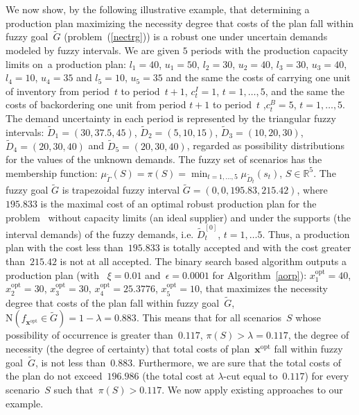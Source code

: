 \documentclass[11pt]{article}
\newcommand{\Rset}{\mathbb{R}}
\begin{document}
We now show, by the following illustrative example, that determining a production
plan maximizing  the necessity degree that costs of the plan fall within 
fuzzy goal~$\widetilde{G}$ (problem~(\ref{nectrg})) is a robust one under uncertain
demands modeled by fuzzy intervals.
We are given $5$ periods with 
the production capacity limits on~a production plan:
$l_1=40$, $u_1=50$,  $l_2=30$, $u_2=40$,
$l_3=30$, $u_3=40$, $l_4=10$, $u_4=35$ and $l_5=10$, $u_5=35$
and the same 
the costs of carrying one unit
of inventory from period~$t$ to period~$t+1$, $c^I_t=1$,
$t=1,\ldots,5$, and the same 
the costs of
backordering one unit from period $t+1$ to period~$t$ ,$c^B_t=5$, $t=1,\ldots,5$.
The demand uncertainty in each period is represented by the 
triangular fuzzy intervals: $\widetilde{D}_1=(30,37.5,45)$, 
 $\widetilde{D}_2=(5,10,15)$,  $\widetilde{D}_3=(10,20,30)$, 
  $\widetilde{D}_4=(20,30,40)$ and  $\widetilde{D}_5=(20,30,40)$,
  regarded as
possibility distributions
for the values of the unknown demands.
The fuzzy set of scenarios has the membership function:
$\mu_{\widetilde{\Gamma}}(S)=\pi(S)=\min_{t=1,\ldots,5}\mu_{\widetilde{D}_t}(s_t)$,
 $S\in\Rset^5$. The fuzzy goal $\widetilde{G}$ is   trapezoidal  fuzzy interval 
$\widetilde{G}=(0,0, 195.83,215.42)$,
where  $195.833$ is the maximal cost of an optimal robust production 
plan for the problem~ without capacity limits 
(an ideal supplier)
and under  the supports (the interval demands)
of the fuzzy demands, i.e. $\widetilde{D}^{[0]}_t$, $t=1,\ldots 5$.
Thus, a production plan with the cost less than~$195.833$ is totally accepted and
with the cost greater than~$215.42$ is not at all accepted.
The binary search based algorithm outputs 
a production plan (with ~$\xi=0.01$ and~$\epsilon=0.0001$ for Algorithm~\ref{aorp}):
$x^{\text{opt}}_1=40$, $x^{\text{opt}}_2=30$,  $x^{\text{opt}}_3=30$,
$x^{\text{opt}}_4=25.3776$,  $x^{\text{opt}}_5=10$,
that maximizes the necessity degree that costs of the plan fall within 
fuzzy goal~$\widetilde{G}$, $\mathrm{N}(f_{\pmb{x}^{\text{opt}}}\in \widetilde{G})=1-\lambda=0.883$.
This means that
 for all scenarios~$S$ whose possibility of occurrence is greater than~$0.117$,
 $\pi(S)>\lambda=0.117$, 
the  degree of necessity (the degree of certainty) that total  costs of plan~$\pmb{x}^{\text{opt}}$ fall within 
fuzzy goal~$\widetilde{G}$, is not less than~$0.883$. Furthermore, we are sure that
the total costs of the plan
do not exceed~$196.986$ (the total cost  at $\lambda$-cut equal to~$0.117$)
for every scenario~$S$ such that~$\pi(S)>0.117$.
We now apply existing approaches to our example.
\end{document}
